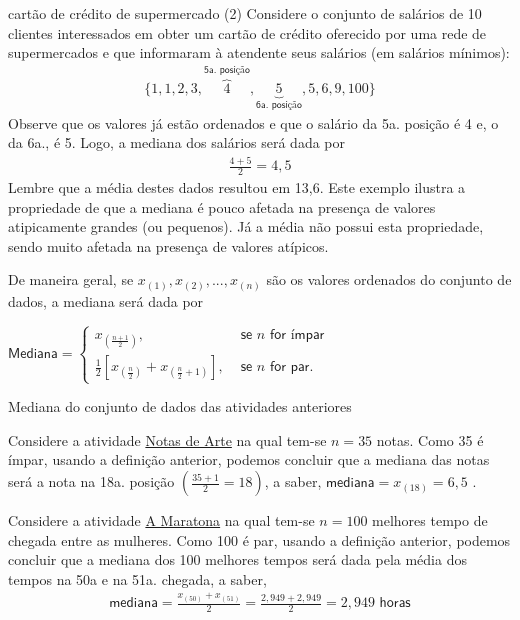 \begin{example}{cartão de crédito de supermercado (2)}
Considere o conjunto de salários de 10 clientes interessados em obter um cartão de crédito oferecido por uma rede de supermercados e que informaram à atendente seus salários (em salários mínimos):
\begin{equation*}
\begin{split}\{1, 1, 2, 3, \overbrace{4}^{\textsf{5a. posição}}, \underbrace{5}_{\textsf{6a. posição}}, 5, 6, 9, 100\}\end{split}
\end{equation*}
Observe que os valores já estão ordenados e que o salário da 5a. posição é 4 e, o da 6a., é 5. Logo, a mediana dos salários será dada por
\begin{equation*}
\begin{split}\frac{4+5}{2}=4,5\end{split}
\end{equation*}
Lembre que a média destes dados resultou em 13,6. Este exemplo ilustra a propriedade de que a mediana é pouco afetada na presença de valores atipicamente grandes (ou pequenos). Já a média não possui esta propriedade, sendo muito afetada na presença de valores atípicos.
\end{example}

De maneira geral, se \(x_{(1)},x_{(2)},...,x_{(n)}\) são os valores ordenados do conjunto de dados, a mediana será dada por

\(\textsf{Mediana}=\left \{ \begin{array}{lr}
x_{\left (\frac{n+1}{2}\right )}, &\textsf{ se }n \textsf{ for ímpar}\\
\frac{1}{2} [ x_{\left (\frac{n}{2}\right )}+x_{\left (\frac{n}{2}+1\right )} ], &\textsf{ se }n \textsf{ for par.}\end{array}\right.\)

\begin{example}{Mediana do conjunto de dados das atividades anteriores}

Considere a atividade \hyperref[\detokenize{PE104-0:ativ-notas-de-artes}]{Notas de Arte} na qual tem-se \(n=35\) notas. Como 35 é ímpar, usando a definição anterior, podemos concluir que a mediana das notas será a nota na 18a. posição \(\left (\frac{35+1}{2}=18\right )\), a saber, \(\textsf{mediana}=x_{(18)}=6,5\) .

Considere a atividade \hyperref[\detokenize{PE104-0:ativ-maratona-de-ny}]{A Maratona} na qual tem-se \(n=100\) melhores tempo de chegada entre as mulheres. Como 100 é par, usando a definição anterior, podemos concluir que a mediana dos 100 melhores tempos será dada pela média dos tempos na 50a e na 51a. chegada, a saber,
\begin{equation*}
\begin{split}\textsf{mediana}=\frac{x_{(50)}+x_{(51)}}{2}=\frac{2,949+2,949}{2}=2,949 \textsf{ horas}\end{split}
\end{equation*}
\end{example}

